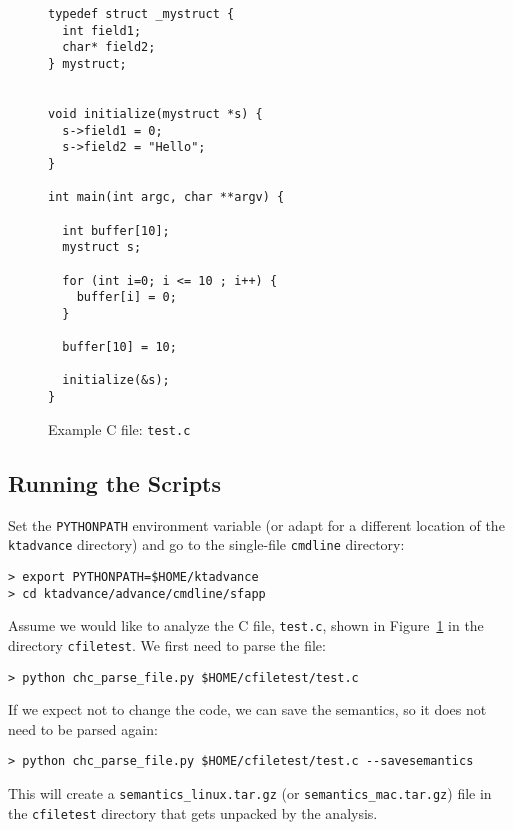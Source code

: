 \documentclass[11pt]{article}
\begin{document}
\begin{figure}
\centering
\begin{minipage}{8cm}
\begin{small}
\begin{lstlisting}[frame=single]
typedef struct _mystruct {
  int field1;
  char* field2;
} mystruct;


void initialize(mystruct *s) {
  s->field1 = 0;
  s->field2 = "Hello";
}

int main(int argc, char **argv) {

  int buffer[10];
  mystruct s;

  for (int i=0; i <= 10 ; i++) {
    buffer[i] = 0;
  }

  buffer[10] = 10;

  initialize(&s);
}
\end{lstlisting}
\end{small}
\end{minipage}
\caption{\label{fig:cfile} Example C file: {\tt test.c}}
\end{figure}

\subsection{Running the Scripts}
Set the {\tt PYTHONPATH} environment variable (or adapt for a different location of the {\tt ktadvance}
directory) and go to the single-file {\tt cmdline} directory:
\begin{verbatim}
> export PYTHONPATH=$HOME/ktadvance
> cd ktadvance/advance/cmdline/sfapp
\end{verbatim}
Assume we would like to analyze the C file, {\tt test.c}, shown in 
Figure~\ref{fig:cfile} in the directory
{\tt cfiletest}. We first need to parse the file:
\begin{verbatim}
> python chc_parse_file.py $HOME/cfiletest/test.c
\end{verbatim}
If we expect not to change the code, we can save the semantics, so it does not need to
be parsed again:
\begin{verbatim}
> python chc_parse_file.py $HOME/cfiletest/test.c --savesemantics
\end{verbatim}
This will create a {\tt semantics\_linux.tar.gz} (or {\tt semantics\_mac.tar.gz}) file in the
{\tt cfiletest} directory that gets unpacked by the analysis.
\end{document}
